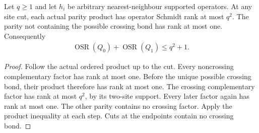 \begin{lemma}
    \label{thm:physical_parity_product_cut_rank}
    \leanok
    Let $q\ge1$ and let $h_i$ be arbitrary nearest-neighbour supported
    operators. At any site cut, each actual parity product has operator
    Schmidt rank at most $q^2$. The parity not containing the possible
    crossing bond has rank at most one. Consequently
    \begin{align*}
        \operatorname{OSR}(Q_0)+\operatorname{OSR}(Q_1)\le q^2+1.
    \end{align*}
\end{lemma}
\begin{proof}
    \leanok
    Follow the actual ordered product up to the cut. Every noncrossing
    complementary factor has rank at most one. Before the unique possible
    crossing bond, their product therefore has rank at most one. The
    crossing complementary factor has rank at most $q^2$, by its two-site
    support. Every later factor again has rank at most one. The other
    parity contains no crossing factor. Apply the product inequality
    at each step. Cuts at the endpoints contain no crossing bond.
\end{proof}

